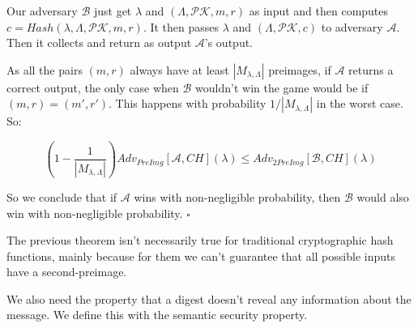 \documentclass[a4paper]{article}
\newcommand*{\qed}{\hfill\ensuremath{\square}}
\begin{document}
 Our adversary $\mathcal{B}$ just get $\lambda$ and 
 $(\Lambda,\mathcal{PK}, m, r)$ as input and then computes
 $c=Hash(\lambda, \Lambda, \mathcal{PK}, m, r)$. It then passes
 $\lambda$ and $(\Lambda, \mathcal{PK}, c)$ to adversary $\mathcal{A}$.
 Then it collects and return as output $\mathcal{A}$'s output.
 
 As all the pairs $(m, r)$ always have at least $|M_{\lambda,\Lambda}|$
 preimages, if $\mathcal{A}$ returns a correct output, the only
 case when $\mathcal{B}$ wouldn't win the game would be if
 $(m, r) = (m', r')$. This happens with probability
 $1/|M_{\lambda,\Lambda}|$ in the worst case.
 So:
 
 $$
 \left(1-\frac{1}{|M_{\lambda,\Lambda}|}\right)
 Adv_{PreImg}[\mathcal{A},CH](\lambda) \leq Adv_{2PreImg}[\mathcal{B},CH](\lambda)
 $$
 
 So we conclude that if $\mathcal{A}$ wins with non-negligible probability, then $\mathcal{B}$
 would also win with non-negligible probability. \qed
 
 The previous theorem isn't necessarily true for traditional
 cryptographic hash functions, mainly because for them we can't
 guarantee that all possible inputs have a second-preimage.
 
 We also need the property that a digest doesn't reveal any information
 about the message. We define this with the semantic security property.
 
\end{document}
